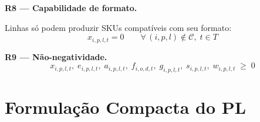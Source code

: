 \documentclass[12pt, a4paper]{article}
\begin{document}
\vspace{8pt}

\begin{mdframed}[style=destaque]
\textbf{\color{ballblue}R8 --- Capabilidade de formato.}
\medskip

Linhas s\'{o} podem produzir SKUs compat\'{i}veis com seu formato:
\[
  x_{i,p,l,t} = 0 \qquad \forall\, (i,p,l) \notin \mathcal{C},\; t \in T
\]
\end{mdframed}

\vspace{8pt}

\begin{mdframed}[style=destaque]
\textbf{\color{ballblue}R9 --- N\~{a}o-negatividade.}
\[
  x_{i,p,l,t},\; e_{i,p,l,t},\; a_{i,p,l,t},\; f_{i,o,d,t},\;
  g_{i,p,l,t},\; s_{i,p,l,t},\; w_{i,p,l,t} \;\geq\; 0
\]
\end{mdframed}

\newpage
\section{Formula\c{c}\~{a}o Compacta do PL}
\end{document}
